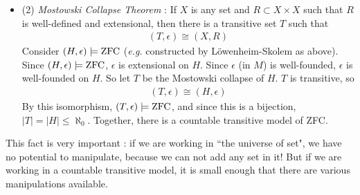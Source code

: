 \documentclass[12pt,a4paper]{article}
\newenvironment{subproof}
{\begin{changemargin}{0.5cm}{0.5cm} 
	}%
	{\end{changemargin}
}
\renewenvironment{i}
{\begin{itemize} 
	}%
	{\end{itemize}
}
\begin{document}
\begin{i}
\quad Then By construction, $\aleph_1 \in H$.
\begin{subproof}
: There is a formula $\varphi$ such that $\varphi(x)$ \emph{iff} $x$ is the least uncountable cardinal. In ZFC, $V_{\kappa} \models \exists x\,\, \varphi(x)$ but the only element that satisfies $\varphi$ in $V_{\kappa}$ is $\aleph_1$. So in the Skolem hull construction, $\aleph_1 \in Z_1 \subset H$
\end{subproof}

This implies that $H$ can not be transitive, since $\aleph_1$ has uncountable many element, but $H$ has only countably many element.
\s

\item[(2)] \emph{Mostowski Collapse Theorem} : If $X$ is any set and $R\subset X\times X$ such that $R$ is well-defined and extensional, then there is a transitive set $T$ such that
\begin{align*}
(T, \epsilon) \cong (X, R)
\end{align*}
Consider $(H, \epsilon) \models \text{ZFC}$ (\textit{e.g.} constructed by L\"owenheim-Skolem as above). Since $(H, \epsilon) \models \text{ZFC}$, $\epsilon$ is extensional on $H$. Since $\epsilon$ (in $M$) is well-founded, $\epsilon$ is well-founded on $H$. So let $T$ be the Mostowski collapse of $H$. $T$ is transitive, so
\begin{align*}
(T, \epsilon) \cong (H, \epsilon)
\end{align*}
By this isomorphism, $(T, \epsilon) \models \text{ZFC}$, and since this is a bijection, $|T| = |H| \leq \aleph_0$. Together, there is a countable transitive model of ZFC.
\end{i}
This fact is very important : if we are working in ``the universe of set", we have no potential to manipulate, because we can not add any set in it! But if we are working in a countable transitive model, it is small enough that there are various manipulations available.
\s
\end{document}

